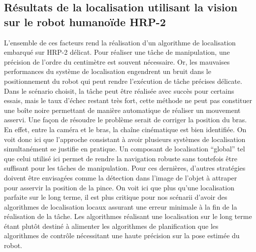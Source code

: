 \subsection{Résultats de la localisation utilisant la vision sur le robot humanoïde HRP-2}

L'ensemble de ces facteurs rend la réalisation d'un algorithme de
localisation embarqué sur HRP-2 délicat. Pour réaliser une tâche de
manipulation, une précision de l'ordre du centimètre est souvent
nécessaire. Or, les mauvaises performances du système de localisation
engendrent un bruit dans le positionnement du robot qui peut rendre
l'exécution de tâche précises délicate. Dans le scénario choisit, la
tâche peut être réalisée avec succès pour certains essais, mais le
taux d'échec restant très fort, cette méthode ne peut pas constituer
une boîte noire permettant de manière automatique de réaliser un
mouvement asservi. Une façon de résoudre le problème serait de
corriger la position du bras. En effet, entre la caméra et le bras, la
chaîne cinématique est bien identifiée. On voit donc ici que
l'approche consistant à avoir plusieurs systèmes de localisation
simultanément se justifie en pratique. Un composant de localisation
``global'' tel que celui utilisé ici permet de rendre la navigation
robuste sans toutefois être suffisant pour les tâches de
manipulation. Pour ces dernières, d'autres stratégies doivent être
envisagées comme la détection dans l'image de l'objet à attraper pour
asservir la position de la pince. On voit ici que plus qu'une
localisation parfaite sur le long terme, il est plus critique pour nos
scénarii d'avoir des algorithmes de localisation locaux assurant une
erreur minimale à la fin de la réalisation de la tâche. Les
algorithmes réalisant une localisation sur le long terme étant plutôt
destiné à alimenter les algorithmes de planification que les
algorithmes de contrôle nécessitant une haute précision sur la pose
estimée du robot.




